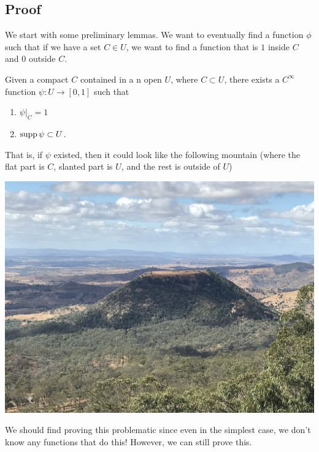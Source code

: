 \documentclass{article}
\begin{document}
\subsection{Proof}
We start with some preliminary lemmas. We want to eventually find a function $\phi$ such that if we have a set $C\in U$, we want to find a function that is $1$ inside $C$ and $0$ outside $C$.
\begin{lemma}
    Given a compact $C$ contained in a n open $U$, where $C \subset U$, there exists a $C^\infty$ function $\psi: U \rightarrow [0,1]$ such that 
    \begin{enumerate}
        \item $\psi|_C = 1$
        \item $\operatorname{supp} \psi \subset U$.
    \end{enumerate}
\end{lemma}
That is, if $\psi$ existed, then it could look like the following mountain (where the flat part is $C$, slanted part is $U$, and the rest is outside of $U$) 
\begin{center}
    \includegraphics[width=0.5\linewidth]{figures/tabletop.jpg}
\end{center}
We should find proving this problematic since even in the simplest case, we don't know any functions that do this! However, we can still prove this.
\end{document}
